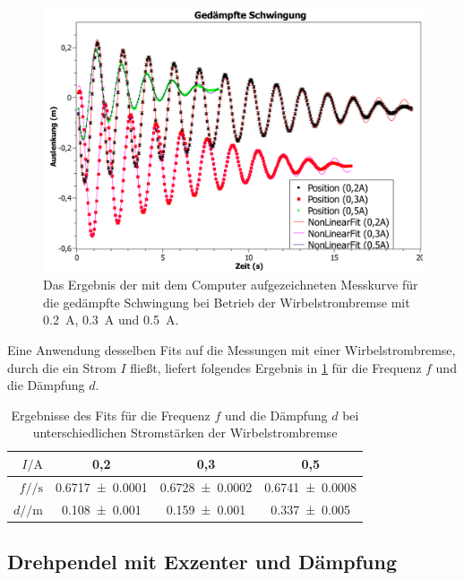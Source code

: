 \documentclass[
	a4paper,
	12pt,
	pagesize,
	ngerman
]{scrartcl}
\begin{document}
	\begin{figure}[htb]
		\includegraphics[width=1\textwidth]{Gedaempfte_Schwingung_Graph}
		\centering
		\caption{Das Ergebnis der mit dem Computer aufgezeichneten Messkurve für die gedämpfte Schwingung bei Betrieb der Wirbelstrombremse mit \SI{0,2}{\ampere}, \SI{0,3}{\ampere} und \SI{0,5}{\ampere}.}
		\label{gedämpfte_Schwingung}
		\centering
	\end{figure}
	Eine Anwendung desselben Fits auf die Messungen mit einer Wirbelstrombremse, durch die ein Strom $ I $ fließt, liefert folgendes Ergebnis in \cref{gedaempftTab} für die Frequenz $ f $ und die Dämpfung $ d $.\\
	\begin{table}[htb]
		\centering
		\begin{tabular}{ r | c | c | c |}
			$I /\si{\ampere}$& 0,2 & 0,3 & 0,5\\ \hline
			$f  /\si{\per \second}$ & \num{0,6717 \pm 0,0001} & \num{0,6728 \pm 0,0002} & \num{0,6741 \pm 0,0008}\\
			$d /\si{\per \meter}  $ & \num{0,108 \pm 0,001} & \num{0,159 \pm 0,001} & \num{0,337 \pm 0,005}
		\end{tabular}
		\caption{Ergebnisse des Fits für die Frequenz $ f $ und die Dämpfung $ d $ bei unterschiedlichen Stromstärken der Wirbelstrombremse}
		\label{gedaempftTab}
	\end{table}
	
	\subsection{Drehpendel mit Exzenter und Dämpfung}
	
\end{document}
